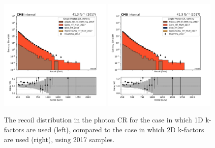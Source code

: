 \begin{figure}
    \begin{center}
        \includegraphics[width=0.49\textwidth]{fig/datamc/cr_g_vbf/cr_g_vbf_recoil_losf_2017.pdf}
        \includegraphics[width=0.49\textwidth]{fig/datamc_2dkfac/cr_g_vbf/cr_g_vbf_recoil_losf_2017.pdf} 
        \caption{The recoil distribution in the photon CR for the case in which 1D k-factors are used (left), 
        compared to the case in which 2D k-factors are used (right), using 2017 samples.}
        \label{fig:recoil_2017}
    \end{center}
\end{figure}

